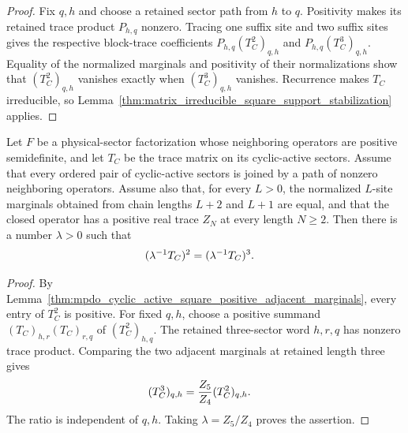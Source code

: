 \begin{proof}\leanok
    Fix $q,h$ and choose a retained sector path from $h$ to $q$. Positivity
    makes its retained trace product $P_{h,q}$ nonzero. Tracing one suffix
    site and two suffix sites gives the respective block-trace coefficients
    $P_{h,q}(T_C^2)_{q,h}$ and $P_{h,q}(T_C^3)_{q,h}$. Equality of the
    normalized marginals and positivity of their normalizations show that
    $(T_C^2)_{q,h}$ vanishes exactly when $(T_C^3)_{q,h}$ vanishes.
    Recurrence makes $T_C$ irreducible, so
    Lemma~\ref{thm:matrix_irreducible_square_support_stabilization} applies.
\end{proof}

\begin{lemma}
    \label{thm:mpdo_cyclic_active_square_cube_adjacent_marginals}
    \leanok
    Let $F$ be a physical-sector factorization whose neighboring operators are
    positive semidefinite, and let $T_C$ be the trace matrix on its
    cyclic-active sectors. Assume that every ordered pair of cyclic-active
    sectors is joined by a path of nonzero neighboring operators. Assume also
    that, for every $L>0$, the normalized $L$-site marginals obtained from
    chain lengths $L+2$ and $L+1$ are equal, and that the closed operator has
    a positive real trace $Z_N$ at every length $N\geq2$. Then there is a
    number $\lambda>0$ such that
    \begin{align}
        (\lambda^{-1}T_C)^2
         & =(\lambda^{-1}T_C)^3.
        \notag
    \end{align}
\end{lemma}

\begin{proof}\leanok
    By
    Lemma~\ref{thm:mpdo_cyclic_active_square_positive_adjacent_marginals},
    every entry of $T_C^2$ is positive. For fixed $q,h$, choose a positive
    summand $(T_C)_{h,r}(T_C)_{r,q}$ of $(T_C^2)_{h,q}$. The retained
    three-sector word $h,r,q$ has nonzero trace product. Comparing the two
    adjacent marginals at retained length three gives
    \begin{align}
        (T_C^3)_{q,h}
         & =\frac{Z_5}{Z_4}(T_C^2)_{q,h}.
        \notag
    \end{align}
    The ratio is independent of $q,h$. Taking $\lambda=Z_5/Z_4$ proves the
    assertion.
\end{proof}

